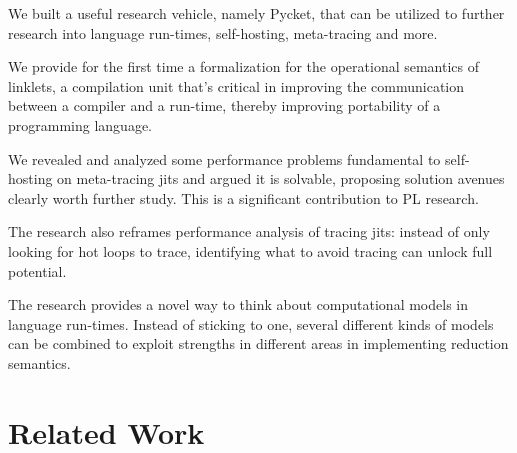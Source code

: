         \begin{paragraph-here}%
            We built a useful research vehicle, namely Pycket, that can be utilized to further research into language run-times, self-hosting, meta-tracing and more. %
        \end{paragraph-here}

        \begin{paragraph-here}%
            We provide for the first time a formalization for the operational semantics of linklets, a compilation unit that's critical in improving the communication between a compiler and a run-time, thereby improving portability of a programming language. %
        \end{paragraph-here}

        \begin{paragraph-here}%
            We revealed and analyzed some performance problems fundamental to self-hosting on meta-tracing \glspl{jit} and argued it is solvable, proposing solution avenues clearly worth further study.  This is a significant contribution to PL research. %
        \end{paragraph-here}

        \begin{paragraph-here}%
            The research also reframes performance analysis of tracing \glspl{jit}: instead of only looking for hot loops to trace, identifying what to avoid tracing can unlock full potential.
        \end{paragraph-here}

        \begin{paragraph-here}%
            The research provides a novel way to think about computational models in language run-times. Instead of sticking to one, several different kinds of models can be combined to exploit strengths in different areas in implementing reduction semantics. %
        \end{paragraph-here}

    \section{Related Work}
        \label{section:related-work}


